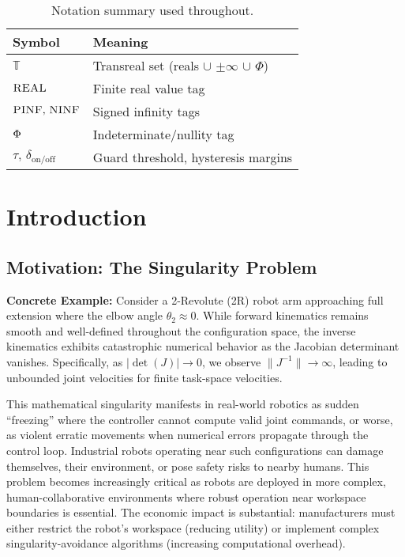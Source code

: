 \documentclass[twoside,11pt]{article}
\newcommand{\TR}{\mathbb{T}}
\newcommand{\trReal}{\textsc{REAL}}
\newcommand{\trPINF}{\textsc{PINF}}
\newcommand{\trNINF}{\textsc{NINF}}
\newcommand{\trPHI}{\textsc{$\Phi$}}
\newcommand{\TAGREAL}{\trReal}
\newcommand{\TAGPINF}{\trPINF}
\newcommand{\TAGNINF}{\trNINF}
\newcommand{\TAGPHI}{\trPHI}
\begin{document}
\begin{table}[t]
\centering\small
\begin{tabular}{ll}
\toprule
Symbol & Meaning \\
\midrule
$\TR$ & Transreal set (reals $\cup$ $\pm\infty$ $\cup$ $\Phi$) \\
$\TAGREAL$ & Finite real value tag \\
$\TAGPINF,\,\TAGNINF$ & Signed infinity tags \\
$\TAGPHI$ & Indeterminate/nullity tag \\
$\tau,\,\delta_{\mathrm{on/off}}$ & Guard threshold, hysteresis margins \\
\bottomrule
\end{tabular}
\caption{Notation summary used throughout.}
\label{tab:notation}
\end{table}

\section{Introduction}
\subsection{Motivation: The Singularity Problem}
\textbf{Concrete Example:} Consider a 2-Revolute (2R) robot arm approaching full extension where the elbow angle $\theta_2 \approx 0$. While forward kinematics remains smooth and well-defined throughout the configuration space, the inverse kinematics exhibits catastrophic numerical behavior as the Jacobian determinant vanishes. Specifically, as $|\det(J)| \to 0$, we observe $\|J^{-1}\| \to \infty$, leading to unbounded joint velocities for finite task-space velocities.

This mathematical singularity manifests in real-world robotics as sudden ``freezing'' where the controller cannot compute valid joint commands, or worse, as violent erratic movements when numerical errors propagate through the control loop. Industrial robots operating near such configurations can damage themselves, their environment, or pose safety risks to nearby humans. This problem becomes increasingly critical as robots are deployed in more complex, human-collaborative environments where robust operation near workspace boundaries is essential. The economic impact is substantial: manufacturers must either restrict the robot's workspace (reducing utility) or implement complex singularity-avoidance algorithms (increasing computational overhead).
\end{document}
